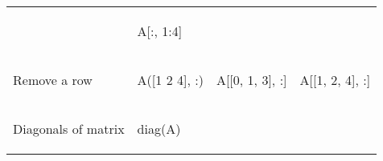 \documentclass[10pt, landscape]{article}
\newenvironment{Shaded}{}{}
\newcommand{\DecValTok}[1]{\textcolor[rgb]{0.25,0.63,0.44}{{#1}}}
\newcommand{\FloatTok}[1]{\textcolor[rgb]{0.25,0.63,0.44}{{#1}}}
\newcommand{\NormalTok}[1]{{#1}}
\begin{document}
\begin{multicols}{2}
\begin{tabular}[ ]{@{}llll@{}}
\begin{minipage}[t]{0.23\columnwidth}
\strut
\end{minipage} & \begin{minipage}[t]{0.20\columnwidth}\raggedright\strut
\begin{Shaded}
\begin{Highlighting}[]
\NormalTok{A[:, }\FloatTok{1}\NormalTok{:}\FloatTok{4}\NormalTok{]}
\end{Highlighting}
\end{Shaded}
\strut
\end{minipage}\tabularnewline
\begin{minipage}[t]{0.23\columnwidth}\raggedright\strut
Remove a row\strut
\end{minipage} & \begin{minipage}[t]{0.23\columnwidth}\raggedright\strut
\begin{Shaded}
\begin{Highlighting}[]
\NormalTok{A([}\FloatTok{1} \FloatTok{2} \FloatTok{4}\NormalTok{], :)}
\end{Highlighting}
\end{Shaded}
\strut
\end{minipage} & \begin{minipage}[t]{0.23\columnwidth}\raggedright\strut
\begin{Shaded}
\begin{Highlighting}[]
\NormalTok{A[[}\DecValTok{0}\NormalTok{, }\DecValTok{1}\NormalTok{, }\DecValTok{3}\NormalTok{], :]}
\end{Highlighting}
\end{Shaded}
\strut
\end{minipage} & \begin{minipage}[t]{0.20\columnwidth}\raggedright\strut
\begin{Shaded}
\begin{Highlighting}[]
\NormalTok{A[[}\FloatTok{1}\NormalTok{, }\FloatTok{2}\NormalTok{, }\FloatTok{4}\NormalTok{], :]}
\end{Highlighting}
\end{Shaded}
\strut
\end{minipage}\tabularnewline
\begin{minipage}[t]{0.23\columnwidth}\raggedright\strut
Diagonals of matrix\strut
\end{minipage} & \begin{minipage}[t]{0.23\columnwidth}\raggedright\strut
\begin{Shaded}
\begin{Highlighting}[]
\NormalTok{diag(A)}
\end{Highlighting}

\end{Shaded}
\end{minipage}
\end{tabular}
\end{multicols}
\end{document}
